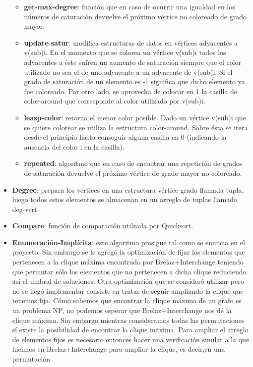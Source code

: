 \documentclass[a4paper,10pt]{article}
\begin{document}
\begin{itemize}
\begin{itemize}
 \item \textbf{get-max-degree}: función que en caso de ocurrir una igualdad en los números de saturación devuelve el próximo
vértice no coloreado de grado mayor.
\item \textbf{update-satur}: modifica estructuras de datos en vértices adyacentes a v(sub)i. En el momento que se colorea un vértice v(sub)i todos los adyacentes a éste sufren un aumento 
de saturación siempre que el color utilizado no sea el de uno adyacente a un adyacente de v(sub)i. Si el grado 
de saturación de un elemento es -1 significa que dicho elemento ya fue coloreado. Por otro lado, se aprovecha de 
colocar en 1 la casilla de color-around que corresponde al color utilizado por v(sub)i.
 \item \textbf{leasp-color}: retorna el menor color posible. Dado un vértice v(sub)i que se quiere colorear se utiliza la estructura color-around. Sobre ésta se itera desde el principio hasta conseguir alguna casilla en 0 (indicando la ausencia del color i en la casilla).
\item \textbf{repeated}: algoritmo que en caso de encontrar una repetición de grados de saturación devuelve el próximo vértice de grado mayor no coloreado.
\end{itemize}
\item \textbf{Degree}: prepara los vértices en una estructura vértice-grado llamada tupla, luego todos estos elementos se almacenan en un arreglo de tuplas llamado deg-vert.
\item \textbf{Compare}: función de comparación utilzada por Quicksort.
 \item \textbf{Enumeración-Implícita}: este algoritmo prosigue tal como se enuncia en el proyecto. Sin embargo se le agregó la optimización de fijar los elementos que pertenecen a la clique máxima encontrada por Brelaz+Interchange teniendo que permutar sólo los elementos que no pertenecen a dicha clique reduciendo así el umbral de soluciones.
Otra optimización que se consideró utilizar pero no se llegó implementar consiste en tratar de seguir ampliando 
la clique que tenemos fija. Cómo sabemos que encontrar la clique máxima de un grafo es un problema NP, no podemos 
esperar que Brelaz+Interchange nos dé la clique máxima. Sin embargo mientras consideramos todas las permutaciones sí existe la posibilidad de encontrar la clique máxima. Para ampliar el arreglo de elementos fijos es necesario entonces hacer una verificación similar a la que hicimos en Brelaz+Interchange para ampliar la clique, es decir,en una permutación 

\end{itemize}
\end{document}
